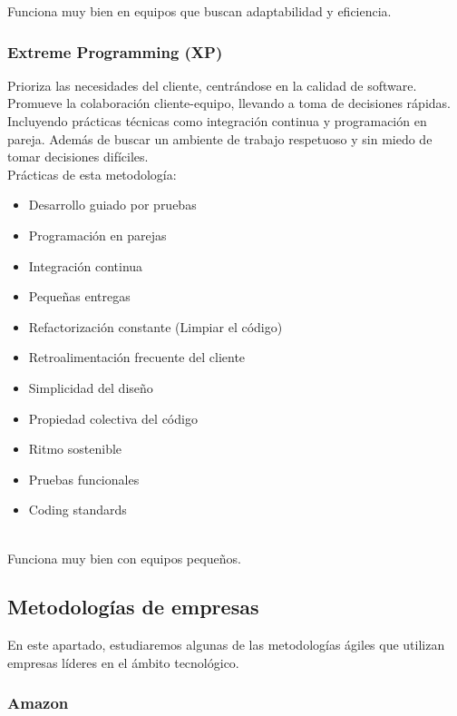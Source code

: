 Funciona muy bien en equipos que buscan adaptabilidad y eficiencia.

\subsubsection{Extreme Programming (XP)}

Prioriza las necesidades del cliente, centrándose en la calidad de software.\\

Promueve la colaboración cliente-equipo, llevando a toma de decisiones rápidas. Incluyendo prácticas técnicas como integración continua y programación en pareja. Además de buscar un ambiente de trabajo respetuoso y sin miedo de tomar decisiones difíciles.\\

Prácticas de esta metodología:
\begin{itemize}
    \item  Desarrollo guiado por pruebas
    \item Programación en parejas
    \item Integración continua
    \item Pequeñas entregas
    \item Refactorización constante (Limpiar el código)
    \item Retroalimentación frecuente del cliente
    \item Simplicidad del diseño
    \item Propiedad colectiva del código
    \item Ritmo sostenible
    \item Pruebas funcionales
    \item Coding standards
\end{itemize}\\

Funciona muy bien con equipos pequeños.

\subsection{Metodologías de empresas}

En este apartado, estudiaremos algunas de las metodologías ágiles que utilizan empresas líderes en el ámbito tecnológico.

\subsubsection{Amazon}

